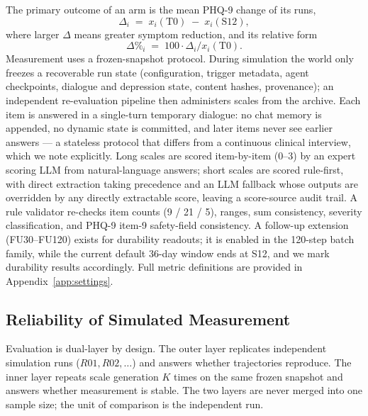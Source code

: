 \documentclass[10pt]{article}
\begin{document}
The primary outcome of an arm is the mean PHQ-9 change of its runs,
\begin{equation}\label{eq:delta}
\Delta_i \;=\; x_i(\mathrm{T0}) \;-\; x_i(\mathrm{S12}),
\end{equation}
where larger $\Delta$ means greater symptom reduction, and its relative form
\begin{equation}\label{eq:deltapct}
\Delta\%_i \;=\; 100 \cdot \Delta_i / x_i(\mathrm{T0}).
\end{equation}
Measurement uses a frozen-snapshot protocol.
During simulation the world only freezes a recoverable run state (configuration, trigger metadata, agent checkpoints, dialogue and depression state, content hashes, provenance); an independent re-evaluation pipeline then administers scales from the archive.
Each item is answered in a single-turn temporary dialogue: no chat memory is appended, no dynamic state is committed, and later items never see earlier answers --- a stateless protocol that differs from a continuous clinical interview, which we note explicitly.
Long scales are scored item-by-item (0--3) by an expert scoring LLM from natural-language answers; short scales are scored rule-first, with direct extraction taking precedence and an LLM fallback whose outputs are overridden by any directly extractable score, leaving a score-source audit trail.
A rule validator re-checks item counts (9 / 21 / 5), ranges, sum consistency, severity classification, and PHQ-9 item-9 safety-field consistency.
A follow-up extension (FU30--FU120) exists for durability readouts; it is enabled in the 120-step batch family, while the current default 36-day window ends at S12, and we mark durability results accordingly.
Full metric definitions are provided in Appendix~\ref{app:settings}.

\subsection{Reliability of Simulated Measurement}\label{sec:reliability}

Evaluation is dual-layer by design.
The outer layer replicates independent simulation runs ($R01, R02, \dots$) and answers whether trajectories reproduce.
The inner layer repeats scale generation $K$ times on the same frozen snapshot and answers whether measurement is stable.
The two layers are never merged into one sample size; the unit of comparison is the independent run.
\end{document}
